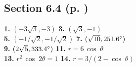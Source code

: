 \begin{multicols}{2}
\subsection*{Section 6.4 (p. \pageref{sec6dot4})}
\textbf{1.} $(-3\sqrt{3},-3)$ \quad \textbf{3.} $(\sqrt{3},-1)$\\
\textbf{5.} $(-1/\sqrt{2},-1/\sqrt{2})$ \quad \textbf{7.} $(\sqrt{10},251.6^\circ)$\\
\textbf{9.} $(2\sqrt{5},333.4^\circ)$ \quad \textbf{11.} $r = 6\,\cos\;\theta$\\
\textbf{13.} $r^2 \,\cos\;2\theta = 1$ \quad \textbf{14.} $r = 3/(2 - \cos\;\theta)$
\end{multicols}
